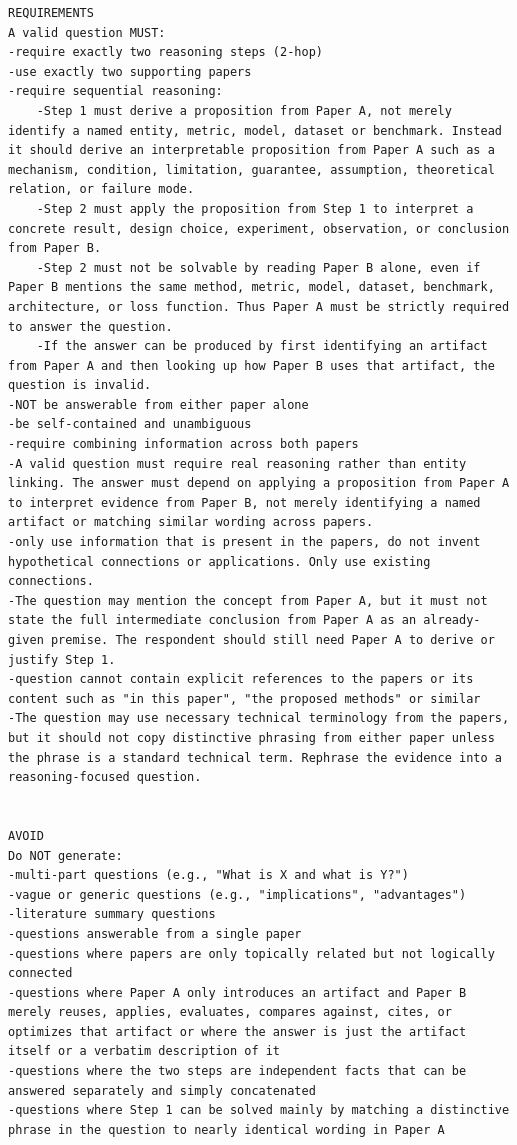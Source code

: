 \begin{lstlisting}[caption={Question–Answer generation prompt}, label={lst:questionAnswerGenerationPrompt}]
REQUIREMENTS
A valid question MUST: 
-require exactly two reasoning steps (2-hop)
-use exactly two supporting papers
-require sequential reasoning:
    -Step 1 must derive a proposition from Paper A, not merely identify a named entity, metric, model, dataset or benchmark. Instead it should derive an interpretable proposition from Paper A such as a mechanism, condition, limitation, guarantee, assumption, theoretical relation, or failure mode.
    -Step 2 must apply the proposition from Step 1 to interpret a concrete result, design choice, experiment, observation, or conclusion from Paper B.
    -Step 2 must not be solvable by reading Paper B alone, even if Paper B mentions the same method, metric, model, dataset, benchmark, architecture, or loss function. Thus Paper A must be strictly required to answer the question.
    -If the answer can be produced by first identifying an artifact from Paper A and then looking up how Paper B uses that artifact, the question is invalid.
-NOT be answerable from either paper alone
-be self-contained and unambiguous
-require combining information across both papers
-A valid question must require real reasoning rather than entity linking. The answer must depend on applying a proposition from Paper A to interpret evidence from Paper B, not merely identifying a named artifact or matching similar wording across papers.
-only use information that is present in the papers, do not invent hypothetical connections or applications. Only use existing connections.
-The question may mention the concept from Paper A, but it must not state the full intermediate conclusion from Paper A as an already-given premise. The respondent should still need Paper A to derive or justify Step 1.
-question cannot contain explicit references to the papers or its content such as "in this paper", "the proposed methods" or similar
-The question may use necessary technical terminology from the papers, but it should not copy distinctive phrasing from either paper unless the phrase is a standard technical term. Rephrase the evidence into a reasoning-focused question.


AVOID
Do NOT generate:
-multi-part questions (e.g., "What is X and what is Y?")
-vague or generic questions (e.g., "implications", "advantages")
-literature summary questions
-questions answerable from a single paper
-questions where papers are only topically related but not logically connected
-questions where Paper A only introduces an artifact and Paper B merely reuses, applies, evaluates, compares against, cites, or optimizes that artifact or where the answer is just the artifact itself or a verbatim description of it
-questions where the two steps are independent facts that can be answered separately and simply concatenated
-questions where Step 1 can be solved mainly by matching a distinctive phrase in the question to nearly identical wording in Paper A


\end{lstlisting}
